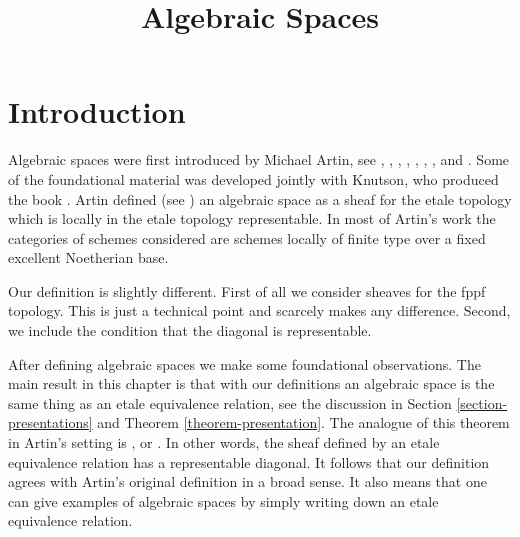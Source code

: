 

%


\title{Algebraic Spaces}


\maketitle

\label{section-phantom}

\tableofcontents

\section{Introduction}
\label{section-introduction}

\noindent
Algebraic spaces were first introduced by Michael Artin,
see \cite{ArtinI}, \cite{ArtinII},
\cite{Artin-Theorem-Representability},
\cite{Artin-Construction-Techniques},
\cite{Artin-Algebraic-Spaces},
\cite{Artin-Algebraic-Approximation},
\cite{Artin-Implicit-Function},
and \cite{ArtinVersal}.
Some of the foundational material was developed jointly with
Knutson, who produced the book \cite{Kn}.
Artin defined (see \cite[Definition 1.3]{Artin-Implicit-Function})
an algebraic space as a sheaf for the etale topology
which is locally in the etale topology representable.
In most of Artin's work the categories of schemes
considered are schemes locally of finite type over a fixed
excellent Noetherian base.

\medskip\noindent
Our definition is slightly different. First of all we consider sheaves
for the fppf topology. This is just a technical point and scarcely makes
any difference. Second, we include the condition that the diagonal is
representable.

\medskip\noindent
After defining algebraic spaces we make some foundational observations.
The main result in this chapter is that with our definitions
an algebraic space is the same thing as an etale equivalence relation,
see the discussion in Section \ref{section-presentations} and
Theorem \ref{theorem-presentation}. The analogue of this theorem in
Artin's setting is \cite[Theorem 1.5]{Artin-Implicit-Function}, or
\cite[Proposition II.1.7]{Kn}. In other words, the sheaf
defined by an etale equivalence relation has a representable diagonal.
It follows that our definition agrees with Artin's original definition
in a broad sense. It also means that one can give examples of algebraic
spaces by simply writing down an etale equivalence relation.

